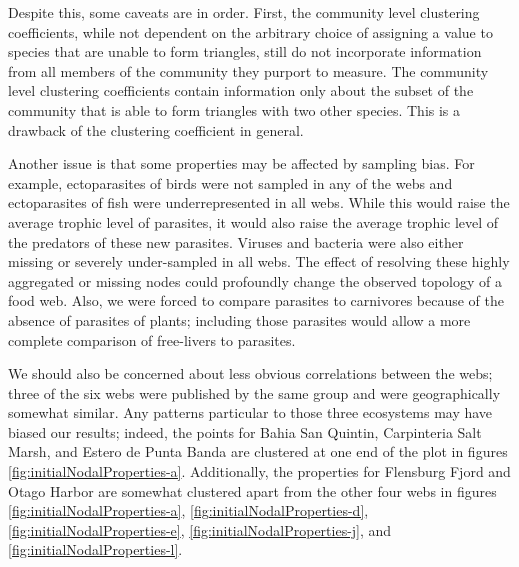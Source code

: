 \documentclass[/home/nkappler/Research/Dissertation/dissertation.tex]{subfiles}
\begin{document}
\begin{bibunit}
Despite this, some caveats are in order. First, the community level clustering
coefficients, while not dependent on the arbitrary choice of assigning a value
to species that are unable to form triangles, still do not incorporate
information from all members of the community they purport to measure. The
community level clustering coefficients contain information only about the
subset of the community that is able to form triangles with two other species.
This is a drawback of the clustering coefficient in general. 

Another issue is that some properties may be affected by sampling bias. For
example, ectoparasites of birds were not sampled in any of the webs and 
ectoparasites of fish were underrepresented in all webs.
While this would raise the average trophic level of parasites, it would also
raise the average trophic level of the predators of these new parasites.
Viruses and bacteria were also either missing or severely under-sampled in all
webs. The effect of resolving these highly aggregated or missing nodes could
profoundly change the observed topology of a food web. Also, we were forced
to compare parasites to carnivores because of the absence of parasites of
plants; including those parasites would allow a more complete comparison of
free-livers to parasites.

We should also be concerned about less obvious correlations between the webs;
three of the six webs were published by the same group and were geographically
somewhat similar. Any patterns particular to those three ecosystems may have
biased our results; indeed, the points for Bahia San Quintin, Carpinteria Salt
Marsh, and Estero de Punta Banda are clustered at one end of the plot in
figures \ref{fig:initialNodalProperties-a}. Additionally, the properties for
Flensburg Fjord and Otago Harbor are somewhat clustered apart from the other
four webs in figures \ref{fig:initialNodalProperties-a},
\ref{fig:initialNodalProperties-d}, \ref{fig:initialNodalProperties-e},
\ref{fig:initialNodalProperties-j}, and \ref{fig:initialNodalProperties-l}.



\end{bibunit}
\end{document}
